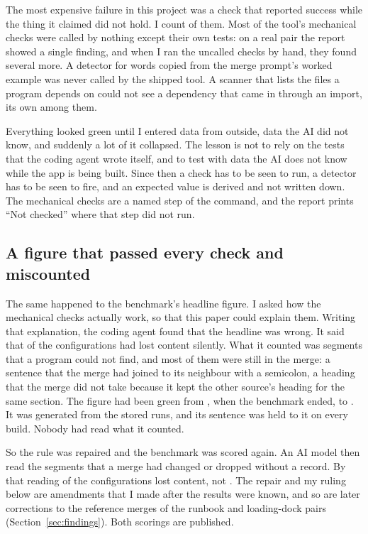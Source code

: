 The most expensive failure in this project was a check that reported success while the thing it claimed did not hold. I count  of them. Most of the tool's mechanical checks were called by nothing except their own tests: on a real pair the report showed a single finding, and when I ran the uncalled checks by hand, they found several more. A detector for words copied from the merge prompt's worked example was never called by the shipped tool. A scanner that lists the files a program depends on could not see a dependency that came in through an import, its own among them.

Everything looked green until I entered data from outside, data the AI did not know, and suddenly a lot of it collapsed. The lesson is not to rely on the tests that the coding agent wrote itself, and to test with data the AI does not know while the app is being built. Since then a check has to be seen to run, a detector has to be seen to fire, and an expected value is derived and not written down. The mechanical checks are a named step of the command, and the report prints ``Not checked'' where that step did not run.

\subsection{A figure that passed every check and miscounted}
\label{sec:audit}

The same happened to the benchmark's headline figure. I asked how the mechanical checks actually work, so that this paper could explain them. Writing that explanation, the coding agent found that the headline was wrong. It said that  of the  configurations had lost content silently. What it counted was segments that a program could not find, and most of them were still in the merge: a sentence that the merge had joined to its neighbour with a semicolon, a heading that the merge did not take because it kept the other source's heading for the same section. The figure had been green from , when the benchmark ended, to . It was generated from the stored runs, and its sentence was held to it on every build. Nobody had read what it counted.

So the rule was repaired and the benchmark was scored again. An AI model then read the segments that a merge had changed or dropped without a record. By that reading  of the  configurations lost content, not . The repair and my ruling below are amendments that I made after the results were known, and so are later corrections to the reference merges of the runbook and loading-dock pairs (Section~\ref{sec:findings}). Both scorings are published.

